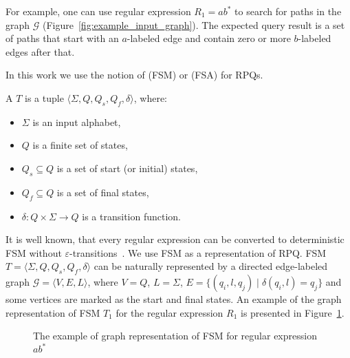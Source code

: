 For example, one can use regular expression $R_1 = ab^*$ to search for paths in the graph $\mathcal{G}$ (Figure~\ref{fig:example_input_graph}).
The expected query result is a set of paths that start with an $a$-labeled edge and contain zero or more $b$-labeled edges after that.

In this work we use the notion of  (FSM) or  (FSA) for RPQs.

\begin{definition}
A  $T$ is a tuple $\langle \Sigma, Q, Q_s, Q_f, \delta \rangle$, where:
\begin{itemize}
    \item $\Sigma$ is an input alphabet,
    \item $Q$ is a finite set of states,
    \item $Q_s \subseteq Q$ is a set of start (or initial) states,
    \item $Q_f \subseteq Q$ is a set of final states,
    \item $\delta: Q \times \Sigma \to Q$ is a transition function.
\end{itemize}
\end{definition}

It is well known, that every regular expression can be converted to deterministic FSM without $\varepsilon$-transitions~\cite{automata:theory:10.5555/1177300}.
We use FSM as a representation of RPQ.
FSM $T = \langle \Sigma, Q, Q_s, Q_f, \delta \rangle$ can be naturally represented by a directed edge-labeled graph $\mathcal{G} = \langle V,E,L \rangle$, where $V = Q$, $L = \Sigma$, $E = \{(q_i,l,q_j) \mid \delta(q_i,l) = q_j\}$ and some vertices are marked as the start and final states.
An example of the graph representation of FSM $T_1$ for the regular expression $R_1$ is presented in Figure~\ref{fig:example_fsm}.

\begin{figure}[h]
    \centering
    \caption{The example of graph representation of FSM for regular expression $ab^*$}
    \label{fig:example_fsm}
\end{figure}

